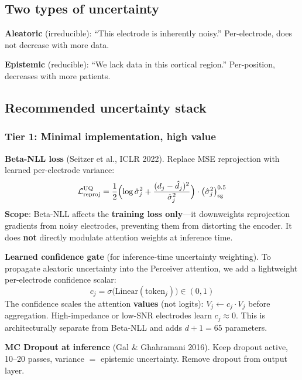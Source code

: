 \documentclass[11pt,letterpaper]{article}
\begin{document}
\subsection{Two types of uncertainty}

\textbf{Aleatoric} (irreducible): ``This electrode is inherently noisy.'' Per-electrode, does not decrease with more data.

\textbf{Epistemic} (reducible): ``We lack data in this cortical region.'' Per-position, decreases with more patients.

\subsection{Recommended uncertainty stack}

\subsubsection{Tier 1: Minimal implementation, high value}

\textbf{Beta-NLL loss} (Seitzer et al., ICLR 2022). Replace MSE reprojection with learned per-electrode variance:
\begin{equation}
\mathcal{L}_{\text{reproj}}^{\text{UQ}} = \frac{1}{2}\Bigl(\log \hat{\sigma}_j^2 + \frac{(d_j - \hat{d}_j)^2}{\hat{\sigma}_j^2}\Bigr) \cdot \bigl(\hat{\sigma}_j^2\bigr)^{0.5}_{\text{sg}}
\end{equation}
\textbf{Scope}: Beta-NLL affects the \textbf{training loss only}---it downweights reprojection gradients from noisy electrodes, preventing them from distorting the encoder. It does \textbf{not} directly modulate attention weights at inference time.

\textbf{Learned confidence gate} (for inference-time uncertainty weighting). To propagate aleatoric uncertainty into the Perceiver attention, we add a lightweight per-electrode confidence scalar:
\begin{equation}
c_j = \sigma\bigl(\text{Linear}(\text{token}_j)\bigr) \in (0, 1)
\end{equation}
The confidence scales the attention \textbf{values} (not logits): $V_j \leftarrow c_j \cdot V_j$ before aggregation. High-impedance or low-SNR electrodes learn $c_j \approx 0$. This is architecturally separate from Beta-NLL and adds $d{+}1 = 65$ parameters.

\textbf{MC Dropout at inference} (Gal \& Ghahramani 2016). Keep dropout active, 10--20 passes, variance $=$ epistemic uncertainty. Remove dropout from output layer.
\end{document}
